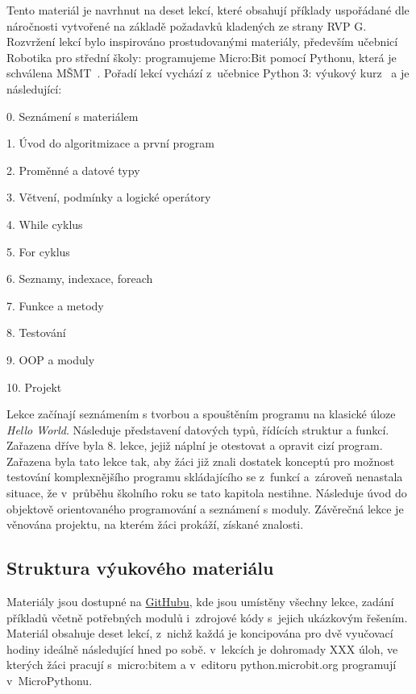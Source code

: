 \documentclass[
  digital,     %
  oneside,     %
  nosansbold,  %
  colorbold, %
  lof,         %
  nolot,         %
]{fithesis4}
\begin{document}
Tento materiál je navrhnut na deset lekcí, které obsahují příklady uspořádané dle náročnosti vytvořené na základě požadavků kladených ze strany RVP G. Rozvržení lekcí bylo inspirováno prostudovanými materiály, především učebnicí Robotika pro střední školy: programujeme Micro:Bit pomocí Pythonu, která je schválena MŠMT~\cite{pythonImysleni}. Pořadí lekcí vychází z~učebnice Python 3: výukový kurz~\cite{Summerfield10} a je následující: 
\vspace{0,1cm}
\begin{compactitem}
    \item[0.] Seznámení s materiálem
    \item[1.] Úvod do algoritmizace a první program
    \item[2.] Proměnné a datové typy
    \item[3.] Větvení, podmínky a logické operátory
    \item[4.] While cyklus
    \item[5.] For cyklus
    \item[6.] Seznamy, indexace, foreach
    \item[7.] Funkce a metody
    \item[8.] Testování
    \item[9.] OOP a moduly
    \item[10.] Projekt
\end{compactitem}
\vspace{0,1cm}
Lekce začínají seznámením s tvorbou a spouštěním programu na klasické úloze \textit{Hello World}. Následuje představení datových typů, řídících struktur a funkcí. Zařazena dříve byla 8. lekce, jejiž náplní je otestovat a opravit cizí program. Zařazena byla tato lekce tak, aby žáci již znali dostatek konceptů pro možnost testování komplexnějšího programu skládajícího se z~funkcí a~zároveň nenastala situace, že v~průběhu školního roku se tato kapitola nestihne. Následuje úvod do objektově orientovaného programování a seznámení s moduly. Závěrečná lekce je věnována projektu, na kterém žáci prokáží, získané znalosti.

\subsection{Struktura výukového materiálu} 
Materiály jsou dostupné na \href{https://github.com/denisa-mat/BP-microbit}{GitHubu}, kde jsou umístěny všechny lekce, zadání příkladů včetně potřebných modulů i~zdrojové kódy s~jejich ukázkovým řešením. Materiál obsahuje deset lekcí, z~nichž každá je koncipována pro dvě vyučovací hodiny ideálně následující hned po sobě. v~lekcích je dohromady XXX %
úloh, ve kterých žáci pracují s~micro:bitem a v~editoru python.microbit.org programují v~MicroPythonu.
\end{document}
